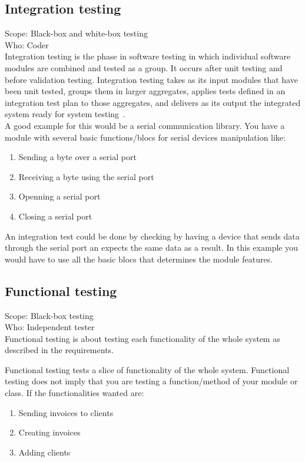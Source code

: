 \documentclass[12pt]{article}
\theoremstyle{definition}
\theoremstyle{definition}
\theoremstyle{remark}
\begin{document}
\subsection{Integration testing}

Scope: Black-box and white-box testing\\
Who: Coder\\

Integration testing is the phase in software testing in which individual software modules are combined and tested as a group. It occurs after unit testing and before validation testing. Integration testing takes as its input modules that have been unit tested, groups them in larger aggregates, applies tests defined in an integration test plan to those aggregates, and delivers as its output the integrated system ready for system testing~\cite{TestingInSoftwareDevelopment:1987}.\\

A good example for this would be a serial communication library. You have a module with several basic functions/blocs for serial devices manipulation like:
\begin{enumerate}
\item Sending a byte over a serial port
\item Receiving a byte using the serial port
\item Openning a serial port
\item Closing a serial port
\end{enumerate}

An integration test could be done by checking by having a device that sends data through the serial port an expects the same data as a result. In this example you would have to use all the basic blocs that determines the module features.


\subsection{Functional testing}

Scope: Black-box testing\\
Who: Independent tester\\

Functional testing is about testing each functionality of the whole system as described in the requirements.

Functional testing tests a slice of functionality of the whole system. Functional testing does not imply that you are testing a function/method of your module or class. If the functionalities wanted are:
\begin{enumerate}
\item Sending invoices to clients
\item Creating invoices
\item Adding clients
\end{enumerate}
\end{document}
